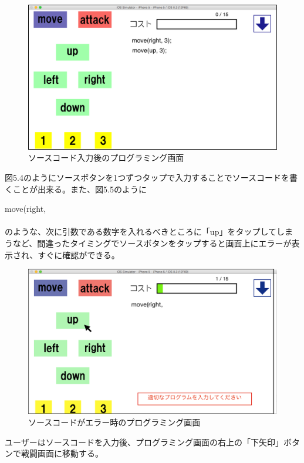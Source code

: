 \documentclass[openany,11pt,papersize]{jsbook}
\begin{document}
\begin{figure}[H]
\begin{center}
\includegraphics[width=12cm, bb=0 0 1136 662]{img/5thParagraph/Prog-ra_programming1.png}
\end{center}
\caption{ソースコード入力後のプログラミング画面}
\end{figure}

図5.4のようにソースボタンを1つずつタップで入力することでソースコードを書くことが出来る。また、図5.5のように
\\
\par move(right, 
\\
\\
のような、次に引数である数字を入れるべきところに「up」をタップしてしまうなど、間違ったタイミングでソースボタンをタップすると画面上にエラーが表示され、すぐに確認ができる。


\begin{figure}[H]
\begin{center}
\includegraphics[width=12cm, bb=0 0 1024 598]{img/5thParagraph/error.png}
\end{center}
\caption{ソースコードがエラー時のプログラミング画面}
\end{figure}
ユーザーはソースコードを入力後、プログラミング画面の右上の「下矢印」ボタンで戦闘画面に移動する。
\end{document}
